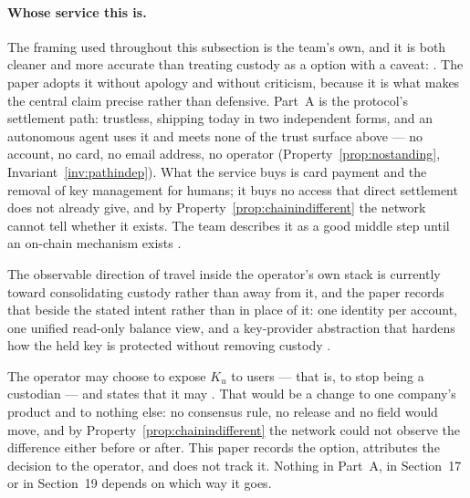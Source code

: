 \paragraph{Whose service this is.}
The framing used throughout this subsection is the team's own, and it is both cleaner and more
accurate than treating custody as a \Flux option with a caveat:  . The paper adopts it without apology
and without criticism, because it is what makes the central claim precise rather than defensive.
Part~A is the protocol's settlement path: trustless, shipping today in two independent forms, and an
autonomous agent uses it and meets none of the trust surface above --- no account, no card, no email
address, no operator (Property~\ref{prop:nostanding}, Invariant~\ref{inv:pathindep}). What the
service buys is card payment and the removal of key management for humans; it buys no access that
direct settlement does not already give, and by Property~\ref{prop:chainindifferent} the network
cannot tell whether it exists. The team describes it as a good middle step until an on-chain
mechanism exists .

The observable direction of travel inside the operator's own stack is currently toward consolidating
custody rather than away from it, and the paper records that beside the stated intent rather than in
place of it: one identity per account, one unified read-only balance view, and a key-provider
abstraction that hardens how the held key is protected without removing custody \inprogress
{}
.

\begin{remark}
\label{rem:operatoroption}
The operator may choose to expose $K_u$ to users --- that is, to stop being a custodian --- and
states that it may . That would be a change to one
company's product and to nothing else: no consensus rule, no \FluxOS release and no \appspec field
would move, and by Property~\ref{prop:chainindifferent} the network could not observe the difference
either before or after. This paper records the option, attributes the decision to the operator, and
does not track it. Nothing in Part~A, in Section~17 or in Section~19 depends on which way it goes.
\end{remark}

